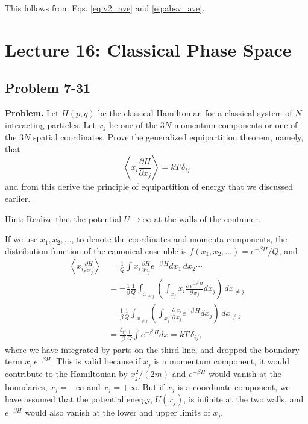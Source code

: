 \documentclass[twocolumn, 10pt]{article}
\numberwithin{equation}{section}
\newenvironment{problem}
{\par\medskip\sffamily \color{problue}
  \textbf{Problem. }\ignorespaces}
{\medskip}
\newenvironment{solution}[1][\empty]
{\par\medskip
  \textbf{\ifx\empty#1{Solution.}\relax\else{#1}\fi} \ignorespaces}
{\medskip}
\begin{document}
\begin{solution}
  This follows from Eqs.
  \eqref{eq:v2_ave} and \eqref{eq:absv_ave}.
\end{solution}

\section{Lecture 16: Classical Phase Space}

\subsection{Problem 7-31}

\begin{problem}
  Let $H(p, q)$ be the classical Hamiltonian
  for a classical system of $N$ interacting particles.
  Let $x_j$ be one of the $3N$ momentum components
  or one of the $3N$ spatial coordinates.
  Prove the generalized equipartition theorem, namely, that
  $$
  \left\langle
    x_i \frac{ \partial H } { \partial x_j }
  \right\rangle
  = kT \, \delta_{ij}
  $$
  and from this derive the principle
  of equipartition of energy that we discussed earlier.

  Hint: Realize that the potential $U \to \infty$
  at the walls of the container.
\end{problem}

\begin{solution}
If we use $x_1, x_2, \dots$, to denote
the coordinates and momenta components,
the distribution function of the canonical ensemble
is $f(x_1, x_2, \dots) = e^{-\beta H}/Q$, and
%
\begin{align*}
  \left\langle
    x_i \frac{ \partial H } { \partial x_j }
  \right\rangle
  &=
  \frac{1}{Q} \int
    x_i \frac{ \partial H } { \partial x_j }
    e^{-\beta \, H}
    d x_1 \, d x_2 \cdots
  \\
  &=
  -
  \frac{1}{\beta}
  \frac{1}{Q}
  \int_{x_{\ne j}}
    \left(
      \int_{x_j}
      x_i \frac{ \partial \, e^{-\beta \, H} } { \partial \, x_j }
      d x_j
    \right) \, d x_{\ne j}
  \\
  &=
  \frac{1}{\beta}
  \frac{1}{Q}
  \int_{x_{\ne j}}
    \left(
      \int_{x_j}
      \frac{ \partial \, x_i } { \partial \, x_j }
      e^{-\beta \, H}
      d x_j
    \right)
  \, d x_{\ne j}
  \\
  &=
  \frac{\delta_{ij}}{\beta}
  \frac{1}{Q}
  \int e^{-\beta \, H} d x
  = kT \, \delta_{ij}
  ,
\end{align*}
%
where we have integrated by parts on the third line,
and dropped the boundary term $x_i \, e^{-\beta H}$.
This is valid because if $x_j$ is a momentum component,
it would contribute to the Hamiltonian by $x_j^2/(2m)$
and $e^{-\beta H}$ would vanish at the boundaries,
$x_j = -\infty$ and $x_j = +\infty$.
%
But if $x_j$ is a coordinate component,
we have assumed that the potential energy, $U(x_j)$,
is infinite at the two walls,
and $e^{-\beta H}$ would also vanish
at the lower and upper limits of $x_j$.
\end{solution}
\end{document}
